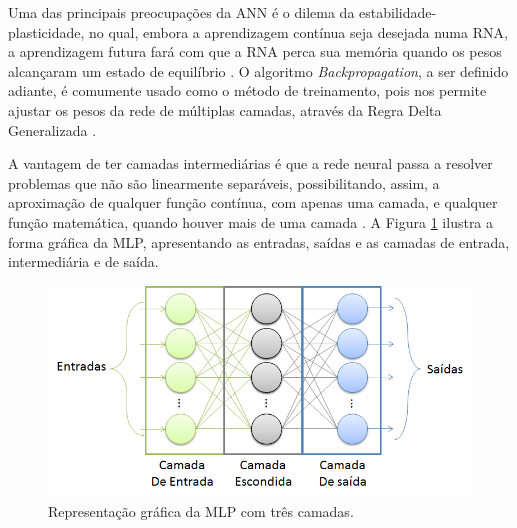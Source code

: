 Uma das principais preocupações da ANN é o dilema da estabilidade-plasticidade, no qual, embora a aprendizagem contínua seja desejada numa RNA, a aprendizagem futura fará com que a RNA perca sua memória quando os pesos alcançaram um estado de equilíbrio \cite{haykin-1994}. O algoritmo \textit{Backpropagation}, a ser definido adiante, é comumente usado como o método de treinamento, pois nos permite ajustar os pesos da rede de múltiplas camadas, através da Regra Delta Generalizada \cite{rumelhart1985learning}.

A vantagem de ter camadas intermediárias é que a rede neural passa a resolver problemas que não são linearmente separáveis, possibilitando, assim, a aproximação de qualquer função contínua, com apenas uma camada, e qualquer função matemática, quando houver mais de uma camada \cite{HAYKIN2007}. A Figura \ref{fig:mlp} ilustra a forma gráfica da MLP, apresentando as entradas, saídas e as camadas de entrada, intermediária e de saída.

\begin{figure}[h]
	\centering
	\includegraphics[width=.6\textwidth]{image/mlp.png}
	\caption{Representação gráfica da MLP com três camadas.}
	\label{fig:mlp}
\end{figure}

